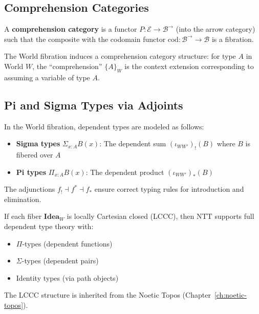 \subsection{Comprehension Categories}
\label{subsec:comprehension}

\begin{definition}
\label{def:comprehension-category}
A \textbf{comprehension category} is a functor $P : \mathcal{E} \to \mathcal{B}^{\to}$
(into the arrow category) such that the composite with the codomain functor
$\mathrm{cod} : \mathcal{B}^{\to} \to \mathcal{B}$ is a fibration.
\end{definition}

\begin{proposition}
\label{prop:world-comprehension}
The World fibration induces a comprehension category structure:
for type $A$ in World $W$, the ``comprehension'' $\{A\}_W$ is the
context extension corresponding to assuming a variable of type $A$.
\end{proposition}

\subsection{Pi and Sigma Types via Adjoints}
\label{subsec:pi-sigma-adjoints}

\begin{proposition}
\label{prop:dependent-types-base-change}
In the World fibration, dependent types are modeled as follows:
\begin{itemize}
  \item \textbf{Sigma types} $\Sigma_{x:A} B(x)$: The dependent sum
        $(\iota_{WW'})_!(B)$ where $B$ is fibered over $A$
  \item \textbf{Pi types} $\Pi_{x:A} B(x)$: The dependent product
        $(\iota_{WW'})_*(B)$
\end{itemize}
The adjunctions $f_! \dashv f^* \dashv f_*$ ensure correct typing rules
for introduction and elimination.
\end{proposition}

\begin{theorem}
\label{thm:lccc-dependent}
If each fiber $\mathbf{Idea}_W$ is locally Cartesian closed (LCCC), then
NTT supports full dependent type theory with:
\begin{itemize}
  \item $\Pi$-types (dependent functions)
  \item $\Sigma$-types (dependent pairs)
  \item Identity types (via path objects)
\end{itemize}
The LCCC structure is inherited from the Noetic Topos
(Chapter~\ref{ch:noetic-topos}).
\end{theorem}

